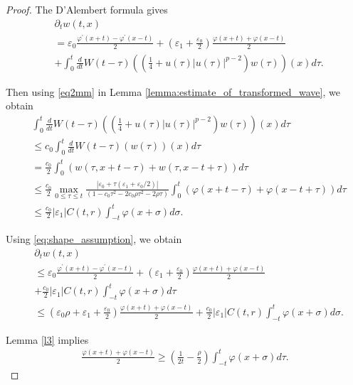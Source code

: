 \documentclass[reqno]{amsart}
\begin{document}
\begin{proof}
The D'Alembert formula gives
\begin{equation}
    \begin{aligned}
   &\partial_t w(t,x)\\
	&= \varepsilon_0 \frac{\varphi^\prime(x+t)- \varphi^\prime(x-t)}{2} 
	+ \left(\varepsilon_1 + \frac{\varepsilon_0}{2} \right) \frac{\varphi(x+t) + \varphi(x-t)}{2} \\
    & + \int_0^t \frac{d}{dt} W(t-\tau)\left( \left(\frac{1}{4}+u(\tau)|u(\tau)|^{p-2}\right) w(\tau) \right) (x) d\tau.
    \end{aligned}
\end{equation}

 
Then using \eqref{eq2mm} in  Lemma \ref{lemma:estimate_of_transformed_wave},
we obtain 
	\begin{align*}
	&\int_0^t \frac{d}{dt} W(t-\tau)\left( \left(\frac{1}{4}+u(\tau)|u(\tau)|^{p-2}\right) w(\tau) \right) (x) d\tau \\
	& \leq c_0 \int_0^t \frac{d}{dt} W(t-\tau) ( w(\tau) ) (x) d\tau \\
	&=  \frac{c_0}{2}\int_0^t \left(  w(\tau, x+t-\tau) +  w(\tau, x-t+\tau) \right) d\tau \\
	& \leq \frac{c_0}{2}\max_{0\leq \tau \leq t} \frac{ |\varepsilon_0 + \tau(\varepsilon_1 + \varepsilon_0/2)|}{(1-c_0 \tau^2-2c_0\rho \tau^2 - 2 \rho \tau)}
	\int_0^t \left(  \varphi(x+t-\tau) +  \varphi( x-t+\tau) \right) d\tau\\
	& \leq \frac{c_0}{2}| \varepsilon_1 | C(t,r) \int_{-t}^t  \varphi(x+\sigma) d\sigma.
	\end{align*}

Using  \eqref{eq:shape_assumption}, we obtain
	\begin{align*}
	&\partial_t w(t,x)\\
	&\leq \varepsilon_0 \frac{\varphi^\prime(x+t)- \varphi^\prime(x-t)}{2} 
	+ \left(\varepsilon_1 + \frac{\varepsilon_0}{2} \right) \frac{\varphi(x+t) + \varphi(x-t)}{2} \\
	& + \frac{c_0}{2} |\varepsilon_1| C(t,r) \int_{-t}^t  \varphi(x+\sigma) d\tau\\
	& \leq \left(\varepsilon_0 \rho + \varepsilon_1 + \frac{\varepsilon_0}{2}\right)\frac{\varphi(x+t) + \varphi(x-t)}{2}
	+ \frac{c_0}{2}| \varepsilon_1 | C(t,r)
	\int_{-t}^t  \varphi(x+\sigma) d\sigma.
	\end{align*}

Lemma \ref{l3} implies
	\begin{align}\label{eq.HH1m1}
	\frac{\varphi(x+t) + \varphi(x-t)}{2}
	\geq  \left( \frac{1}{2t} - \frac \rho 2 \right)
	\int_{-t}^t  \varphi(x+\sigma) d\tau. 
	\end{align}


\end{proof}
\end{document}
